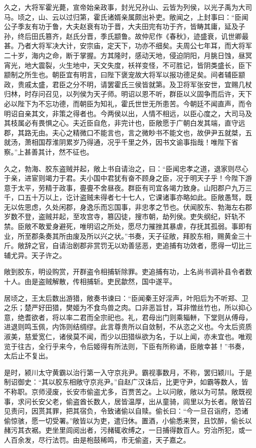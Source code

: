 \documentclass[]{article}
\begin{document}
久之，大将军霍光薨，宣帝始亲政事，封光兄孙山、云皆为列侯，以光子禹为大司马。顷之，山、云以过归第，霍氏诸婿亲属颇出补吏。敞闻之，上封事曰：``臣闻公子季友有功于鲁，大夫赵衰有功于晋，大夫田完有功于齐，皆畴其庸，延及子孙，终后田氏篡齐，赵氏分晋，季氏颛鲁。故仲尼作《春秋》，迹盛衰，讥世卿最甚。乃者大将军决大计，安宗庙，定天下，功亦不细矣。夫周公七年耳，而大将军二十岁，海内之命，断于掌握。方其隆时，感动天地，侵迫阴阳，月朓日蚀，昼冥宵光，地大震裂，火生地中，天文失度，袄祥变怪，不可胜记，皆阴类盛长，臣下颛制之所生也。朝臣宜有明言，曰陛下褒宠故大将军以报功德足矣。间者辅臣颛政，贵戚太盛，君臣之分不明，请罢霍氏三侯皆就第。及卫将军张安世，宜赐几杖归林，时存问召见，以列侯为天子师。明诏以恩不听，群臣以义固争而后许，天下必以陛下为不忘功德，而朝臣为知礼，霍氏世世无所患苦。今朝廷不闻直声，而令明诏自亲其文，非策之得者也。今两侯以出，人情不相远，以臣心度之，大司马及其枝属必有畏惧之心。夫近臣自危，非完计也，臣敞愿于广朝白发其端，直守远郡，其路无由。夫心之精微口不能言也，言之微眇书不能文也，故伊尹五就桀，五就汤，萧相国荐淮阴累岁乃得通，况乎千里之外，因书文谕事指哉！唯陛下省察。''上甚善其计，然不征也。

久之，勃海、胶东盗贼并起，敞上书自请治之，曰：``臣闻忠孝之道，退家则尽心于亲，进宦则竭力于君。夫小国中君犹有奋不顾身之臣，况于明天子乎！今陛下游意于太平，劳精于政事，亹亹不舍昼夜。群臣有司宜各竭力致身。山阳郡户九万三千，口五十万以上，讫计盗贼未得者七十七人，它课诸事亦略如此。臣敞愚驽，既无以佐思虑，久处闲郡，身逸乐而忘国事，非忠孝之节也。伏闻胶东、勃海左右郡岁数不登，盗贼并起，至攻宫寺，篡囚徒，搜市朝，劫列侯。吏失纲纪，奸轨不禁。臣敞不敢爱身避死，唯明诏之所处，愿尽力摧挫其暴虐，存抚其孤弱。事即有业，所至郡条奏其所由废及所以兴之状。''书奏，天子征敞，拜胶东相，赐黄金三十斤。敞辞之官，自请治剧郡非赏罚无以劝善惩恶，吏追捕有功效者，愿得一切比三辅尤异。天子许之。

敞到胶东，明设购赏，开群盗令相捕斩除罪。吏追捕有功，上名尚书调补县令者数十人。由是盗贼解散，传相捕斩。吏民歙然，国中遂平。

居顷之，王太后数出游猎，敞奏书谏曰：``臣闻秦王好淫声，叶阳后为不听郑、卫之乐；楚严好田猎，樊姬为不食鸟兽之肉。口非恶旨甘，耳非憎丝竹也，所以抑心意，绝耆欲者，将以率二君而全宗祀也。礼，君母出门则乘辎軿，下堂则从傅母，进退则鸣玉佩，内饰则结绸缪。此言尊贵所以自敛制，不从恣之义也。今太后资质淑美，慈爱宽仁，诸侯莫不闻，而少以田猎纵欲为名，于以上闻，亦未宜也。唯观览于往古，全行乎来今，令后姬得有所法则，下臣有所称诵，臣敞幸甚！''书奏，太后止不复出。

是时，颍川太守黄霸以治行第一入守京兆尹。霸视事数月，不称，罢归颖川。于是制诏御史：``其以胶东相敞守京兆尹。''自赵广汉诛后，比更守尹，如霸等数人，皆不称职。京师浸废，长安市偷盗尤多，百贾苦之。上以问敞，敞以为可禁。敞既视事，求问长安父老，偷盗酋长数人，居皆温厚，出从童骑，闾里以为长者。敞皆召见责问，因贳其罪，把其宿负，令致诸偷以自赎。偷长曰：``今一旦召诣府，恐诸偷惊骇，愿一切受署。''敞皆以为吏，遣归休。置酒，小偷悉来贺，且饮醉，偷长以赭污其衣裾。吏坐里闾阅出者，污赭辄收缚之，一日捕得数百人。穷治所犯，或一人百余发，尽行法罚。由是枹鼓稀鸣，市无偷盗，天子嘉之。
\end{document}
